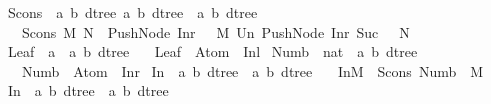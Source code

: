 \begin{isabellebody}
\isamarkupfalse%
\ Scons\ {\isacharcolon}{\isacharcolon}\ {\isachardoublequoteopen}{\isacharbrackleft}{\isacharparenleft}{\isacharprime}a{\isacharcomma}\ {\isacharprime}b{\isacharparenright}\ dtree{\isacharcomma}\ {\isacharparenleft}{\isacharprime}a{\isacharcomma}\ {\isacharprime}b{\isacharparenright}\ dtree{\isacharbrackright}\ {\isacharequal}{\isachargreater}\ {\isacharparenleft}{\isacharprime}a{\isacharcomma}\ {\isacharprime}b{\isacharparenright}\ dtree{\isachardoublequoteclose}\isanewline
\ \ \ {\isachardoublequoteopen}Scons\ M\ N\ {\isacharequal}{\isacharequal}\ {\isacharparenleft}Push{\isacharunderscore}Node\ {\isacharparenleft}Inr\ {}{\isacharparenright}\ {\isacharbackquote}\ M{\isacharparenright}\ Un\ {\isacharparenleft}Push{\isacharunderscore}Node\ {\isacharparenleft}Inr\ {\isacharparenleft}Suc\ {}{\isacharparenright}{\isacharparenright}\ {\isacharbackquote}\ N{\isacharparenright}{\isachardoublequoteclose}\isanewline
\isanewline
\isanewline
{}\isamarkupfalse%
\ Leaf\ {\isacharcolon}{\isacharcolon}\ {\isachardoublequoteopen}{\isacharprime}a\ {\isacharequal}{\isachargreater}\ {\isacharparenleft}{\isacharprime}a{\isacharcomma}\ {\isacharprime}b{\isacharparenright}\ dtree{\isachardoublequoteclose}\isanewline
\ \ \ {\isachardoublequoteopen}Leaf\ {\isacharequal}{\isacharequal}\ Atom\ {\isasymcirc}\ Inl{\isachardoublequoteclose}\isanewline
{}\isamarkupfalse%
\ Numb\ {\isacharcolon}{\isacharcolon}\ {\isachardoublequoteopen}nat\ {\isacharequal}{\isachargreater}\ {\isacharparenleft}{\isacharprime}a{\isacharcomma}\ {\isacharprime}b{\isacharparenright}\ dtree{\isachardoublequoteclose}\isanewline
\ \ \ {\isachardoublequoteopen}Numb\ {\isacharequal}{\isacharequal}\ Atom\ {\isasymcirc}\ Inr{\isachardoublequoteclose}\isanewline
\isanewline
\isanewline
{}\isamarkupfalse%
\ In{}\ {\isacharcolon}{\isacharcolon}\ {\isachardoublequoteopen}{\isacharparenleft}{\isacharprime}a{\isacharcomma}\ {\isacharprime}b{\isacharparenright}\ dtree\ {\isacharequal}{\isachargreater}\ {\isacharparenleft}{\isacharprime}a{\isacharcomma}\ {\isacharprime}b{\isacharparenright}\ dtree{\isachardoublequoteclose}\isanewline
\ \ \ {\isachardoublequoteopen}In{}{\isacharparenleft}M{\isacharparenright}\ {\isacharequal}{\isacharequal}\ Scons\ {\isacharparenleft}Numb\ {}{\isacharparenright}\ M{\isachardoublequoteclose}\isanewline
{}\isamarkupfalse%
\ In{}\ {\isacharcolon}{\isacharcolon}\ {\isachardoublequoteopen}{\isacharparenleft}{\isacharprime}a{\isacharcomma}\ {\isacharprime}b{\isacharparenright}\ dtree\ {\isacharequal}{\isachargreater}\ {\isacharparenleft}{\isacharprime}a{\isacharcomma}\ {\isacharprime}b{\isacharparenright}\ dtree{\isachardoublequoteclose}\isanewline

\end{isabellebody}
